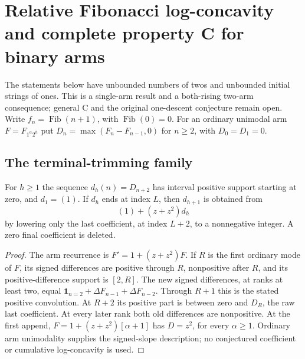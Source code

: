 \section{Relative Fibonacci log-concavity and complete property C for binary arms}
The statements below have unbounded numbers of twos and unbounded initial
strings of ones.  This is a single-arm result and a both-rising two-arm
consequence; general C and the original one-descent conjecture remain open.
Write $f_n=\operatorname{Fib}(n+1)$, with $\operatorname{Fib}(0)=0$.
For an ordinary unimodal arm $F=F_{1^\alpha2^h}$ put
$D_n=\max(F_n-F_{n-1},0)$ for $n\ge2$, with $D_0=D_1=0$.

\subsection*{The terminal-trimming family}
\begin{lemma}
For $h\ge1$ the sequence $d_h(n)=D_{n+2}$ has interval positive
support starting at zero, and $d_1=(1)$.  If $d_h$ ends at index $L$,
then $d_{h+1}$ is obtained from
\[
                  (1)+(z+z^2)d_h
\]
by lowering only the last coefficient, at index $L+2$, to a
nonnegative integer.  A zero final coefficient is deleted.
\end{lemma}
\begin{proof}
The arm recurrence is $F'=1+(z+z^2)F$.  If $R$ is the first
ordinary mode of $F$, its signed differences are positive through
$R$, nonpositive after $R$, and its positive-difference support is
$[2,R]$.  The new signed differences, at ranks at least two, equal
$\mathbf1_{n=2}+\Delta F_{n-1}+\Delta F_{n-2}$.
Through $R+1$ this is the stated positive convolution.  At $R+2$
its positive part is between zero and $D_R$, the raw last coefficient.
At every later rank both old differences are nonpositive.  At the
first append, $F=1+(z+z^2)[\alpha+1]$ has $D=z^2$, for every
$\alpha\ge1$.  Ordinary arm unimodality supplies the signed-slope
description; no conjectured coefficient or cumulative log-concavity
is used.
\end{proof}


